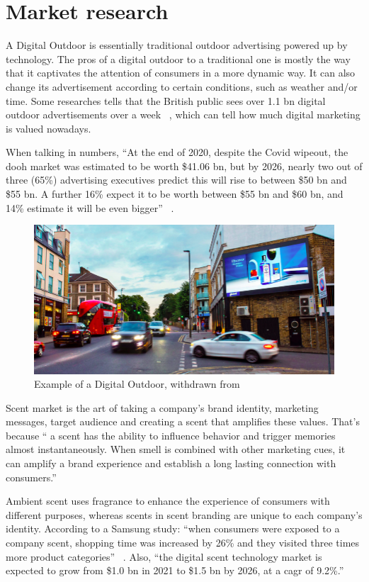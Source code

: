 \section{Market research}
\label{sec:market-research}
A Digital Outdoor is essentially traditional outdoor advertising powered up by technology. 
The pros of a digital outdoor to a traditional one is mostly the way that it captivates the attention of consumers in a more dynamic way. 
It can also change its advertisement according to certain conditions, such as weather and/or time. Some researches tells that the British public sees over 1.1 \gls{bn} digital outdoor advertisements over a week ~\cite{digital-outdoor}, which can tell how much digital marketing is valued nowadays.

When talking in numbers, ``At the end of 2020, despite the Covid wipeout, the \gls{dooh} market was estimated to be worth \$41.06 \gls{bn}, but by 2026, nearly two out of three (65\%) advertising executives predict this will rise to between \$50 \gls{bn} and \$55 \gls{bn}. 
A further 16\% expect it to be worth between \$55 \gls{bn} and \$60 \gls{bn}, and 14\% estimate it will be even bigger'' ~\cite{outdoor-market}.

\begin{figure}[htb!]
\centering
    \includegraphics[width=0.7\columnwidth]{./img/DigitalOutdoor.png}
  \caption{Example of a Digital Outdoor, withdrawn from~\cite{digital-outdoor}}%
\label{fig:dig-outdoor}
\end{figure}

Scent market is the art of taking a company's brand identity, marketing messages, target audience and creating a scent that amplifies these values. 
That's because `` a scent has the ability to influence behavior and trigger memories almost instantaneously. When smell is combined with other marketing cues, it can amplify a brand experience and establish a long lasting connection with consumers.'' ~\cite{scent-market}

Ambient scent uses fragrance to enhance the experience of consumers with different purposes, whereas scents in scent branding are unique to each company's identity.
According to a Samsung study: ``when consumers were exposed to a company scent, shopping time was increased by 26\% and they visited three times more product categories'' ~\cite{scent-stats}.
Also, ``the digital scent technology market is expected to grow from \$1.0 \gls{bn} in 2021 to \$1.5 \gls{bn} by 2026, at a \gls{cagr} of 9.2\%.'' ~\cite{scent-money}

